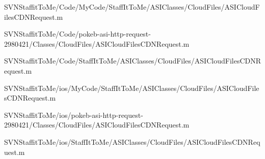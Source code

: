 \begin{DoxyCompactItemize}
\-S\-V\-N\-Staffit\-To\-Me/\-Code/\-My\-Code/\-Staff\-It\-To\-Me/\-A\-S\-I\-Classes/\-Cloud\-Files/\-A\-S\-I\-Cloud\-Files\-C\-D\-N\-Request.\-m\item 
\-S\-V\-N\-Staffit\-To\-Me/\-Code/pokeb-\/asi-\/http-\/request-\/2980421/\-Classes/\-Cloud\-Files/\-A\-S\-I\-Cloud\-Files\-C\-D\-N\-Request.\-m\item 
\-S\-V\-N\-Staffit\-To\-Me/\-Code/\-Staff\-It\-To\-Me/\-A\-S\-I\-Classes/\-Cloud\-Files/\-A\-S\-I\-Cloud\-Files\-C\-D\-N\-Request.\-m\item 
\-S\-V\-N\-Staffit\-To\-Me/ios/\-My\-Code/\-Staff\-It\-To\-Me/\-A\-S\-I\-Classes/\-Cloud\-Files/\-A\-S\-I\-Cloud\-Files\-C\-D\-N\-Request.\-m\item 
\-S\-V\-N\-Staffit\-To\-Me/ios/pokeb-\/asi-\/http-\/request-\/2980421/\-Classes/\-Cloud\-Files/\-A\-S\-I\-Cloud\-Files\-C\-D\-N\-Request.\-m\item 
\-S\-V\-N\-Staffit\-To\-Me/ios/\-Staff\-It\-To\-Me/\-A\-S\-I\-Classes/\-Cloud\-Files/\-A\-S\-I\-Cloud\-Files\-C\-D\-N\-Request.\-m\end{DoxyCompactItemize}
